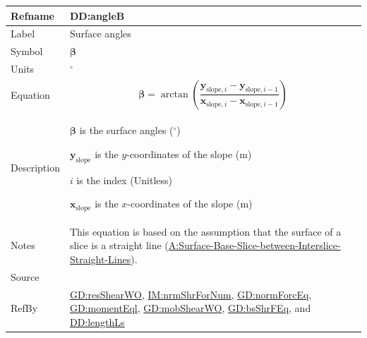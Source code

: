 \documentclass[12pt]{article}
\begin{document}
\medskip
\noindent
\begin{minipage}{\textwidth}
\begin{tabular}{>{\raggedright}p{}>{\raggedright\arraybackslash}p{}}
\toprule \textbf{Refname} & \textbf{DD:angleB}
\label{DD:angleB}
\\ \midrule
Label & Surface angles
        
\\ \midrule
Symbol & $\symbf{β}$
         
\\ \midrule
Units & ${{}^{\circ}}$
        
\\ \midrule
Equation & \begin{displaymath}
           \symbf{β}=\arctan\left(\frac{{\symbf{y}_{\text{slope},i}}-{\symbf{y}_{\text{slope},i-1}}}{{\symbf{x}_{\text{slope},i}}-{\symbf{x}_{\text{slope},i-1}}}\right)
           \end{displaymath}
\\ \midrule
Description & \begin{symbDescription}
              \item{$\symbf{β}$ is the surface angles (${{}^{\circ}}$)}
              \item{${\symbf{y}_{\text{slope}}}$ is the $y$-coordinates of the slope (${\text{m}}$)}
              \item{$i$ is the index (Unitless)}
              \item{${\symbf{x}_{\text{slope}}}$ is the $x$-coordinates of the slope (${\text{m}}$)}
              \end{symbDescription}
\\ \midrule
Notes & This equation is based on the assumption that the surface of a slice is a straight line (\hyperref[assumpSBSBISL]{A:Surface-Base-Slice-between-Interslice-Straight-Lines}).
        
\\ \midrule
Source & \cite{fredlund1977}
         
\\ \midrule
RefBy & \hyperref[GD:resShearWO]{GD:resShearWO}, \hyperref[IM:nrmShrForNum]{IM:nrmShrForNum}, \hyperref[GD:normForcEq]{GD:normForcEq}, \hyperref[GD:momentEql]{GD:momentEql}, \hyperref[GD:mobShearWO]{GD:mobShearWO}, \hyperref[GD:bsShrFEq]{GD:bsShrFEq}, and \hyperref[DD:lengthLs]{DD:lengthLs}
        
\\ \bottomrule
\end{tabular}
\end{minipage}
\end{document}
